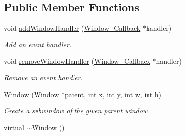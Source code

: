 \subsection*{Public Member Functions}
\begin{DoxyCompactItemize}
\item 
\hypertarget{classGUI_1_1Window_abcae02f41f2d8309efcf741f788b571f}{void \hyperlink{classGUI_1_1Window_abcae02f41f2d8309efcf741f788b571f}{add\-Window\-Handler} (\hyperlink{structGUI_1_1Window__Callback}{Window\-\_\-\-Callback} $\ast$handler)}\label{classGUI_1_1Window_abcae02f41f2d8309efcf741f788b571f}

\begin{DoxyCompactList}\small\item\em Add an event handler. \end{DoxyCompactList}\item 
\hypertarget{classGUI_1_1Window_a1b0d04de52442a6c8a6b14152f8eed25}{void \hyperlink{classGUI_1_1Window_a1b0d04de52442a6c8a6b14152f8eed25}{remove\-Window\-Handler} (\hyperlink{structGUI_1_1Window__Callback}{Window\-\_\-\-Callback} $\ast$handler)}\label{classGUI_1_1Window_a1b0d04de52442a6c8a6b14152f8eed25}

\begin{DoxyCompactList}\small\item\em Remove an event handler. \end{DoxyCompactList}\item 
\hypertarget{classGUI_1_1Window_a0d5c7ab96f4347c33c50b47de9c18914}{\hyperlink{classGUI_1_1Window_a0d5c7ab96f4347c33c50b47de9c18914}{Window} (\hyperlink{classGUI_1_1Window}{Window} $\ast$\hyperlink{classGUI_1_1Window_a2e593ff65e7702178d82fe9010a0b539}{parent}, int \hyperlink{classGUI_1_1Window_a6ca6a80ca00c9e1d8ceea8d3d99a657d}{x}, int \hyperlink{classGUI_1_1Window_a0ee8e923aff2c3661fc2e17656d37adf}{y}, int w, int h)}\label{classGUI_1_1Window_a0d5c7ab96f4347c33c50b47de9c18914}

\begin{DoxyCompactList}\small\item\em Create a subwindow of the given parent window. \end{DoxyCompactList}\item 
\hypertarget{classGUI_1_1Window_a57330526ba666a5b67ccc269d11dd742}{virtual \hyperlink{classGUI_1_1Window_a57330526ba666a5b67ccc269d11dd742}{$\sim$\-Window} ()}\label{classGUI_1_1Window_a57330526ba666a5b67ccc269d11dd742}


\end{DoxyCompactItemize}
